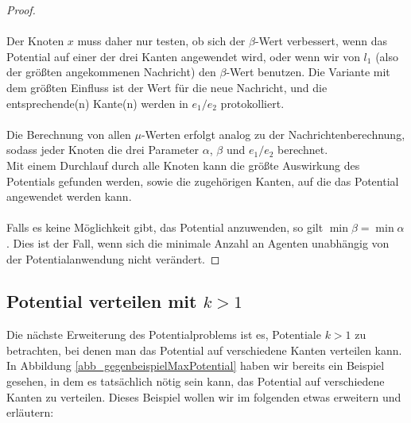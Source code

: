 \begin{proof}
		\\
		\\
		Der Knoten $x$ muss daher nur testen, ob sich der $\beta$-Wert verbessert, wenn das Potential auf einer der drei Kanten angewendet wird, oder wenn wir von $l_{1}$ (also der größten angekommenen Nachricht) den $\beta$-Wert benutzen. Die Variante mit dem größten Einfluss ist der Wert für die neue Nachricht, und die entsprechende(n) Kante(n) werden in $e_1/e_2$ protokolliert.
		\\
		\\
		Die Berechnung von allen $\mu$-Werten erfolgt analog zu der Nachrichtenberechnung, sodass jeder Knoten die drei Parameter $\alpha$, $\beta$ und $e_1/e_2$ berechnet. \\
		Mit einem Durchlauf durch alle Knoten kann die größte Auswirkung des Potentials gefunden werden, sowie die zugehörigen Kanten, auf die das Potential angewendet werden kann.
		\\
		\\
		Falls es keine Möglichkeit gibt, das Potential anzuwenden, so gilt $\min \beta = \min \alpha$. Dies ist der Fall, wenn sich die minimale Anzahl an Agenten unabhängig von der Potentialanwendung nicht verändert.
	\end{proof}
	
	

\subsection{Potential verteilen mit $k > 1$}\label{kap_pot>1_verteilt}

Die nächste Erweiterung des Potentialproblems ist es, Potentiale $k > 1$ zu betrachten, bei denen man das Potential auf verschiedene Kanten verteilen kann.\\
In Abbildung \ref{abb_gegenbeispielMaxPotential} haben wir bereits ein Beispiel gesehen, in dem es tatsächlich nötig sein kann, das Potential auf verschiedene Kanten zu verteilen. Dieses Beispiel wollen wir im folgenden etwas erweitern und erläutern:

